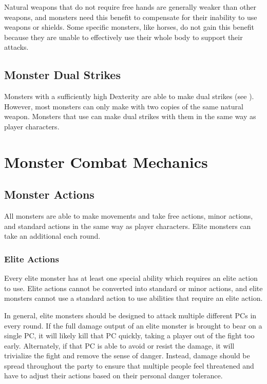         Natural weapons that do not require free hands are generally weaker than other weapons, and monsters need this benefit to compensate for their inability to use weapons or shields.
        Some specific monsters, like horses, do not gain this benefit because they are unable to effectively use their whole body to support their attacks.

    \subsection{Monster Dual Strikes}\label{Monster Dual Strikes}
        Monsters with a sufficiently high Dexterity are able to make dual strikes (see ).
        However, most monsters can only make  with two copies of the same  natural weapon.
        Monsters that use  can make dual strikes with them in the same way as player characters.

\section{Monster Combat Mechanics}

    \subsection{Monster Actions}\label{Monster Actions}
        All monsters are able to make movements and take free actions, minor actions, and standard actions in the same way as player characters.
        Elite monsters can take an additional  each round.

        \subsubsection{Elite Actions}\label{Elite Actions}
            Every elite monster has at least one special ability which requires an elite action to use.
            Elite actions cannot be converted into standard or minor actions, and elite monsters cannot use a standard action to use abilities that require an elite action.

            In general, elite monsters should be designed to attack multiple different PCs in every round.
            If the full damage output of an elite monster is brought to bear on a single PC, it will likely kill that PC quickly, taking a player out of the fight too early.
            Alternately, if that PC is able to avoid or resist the damage, it will trivialize the fight and remove the sense of danger.
            Instead, damage should be spread throughout the party to ensure that multiple people feel threatened and have to adjust their actions based on their personal danger tolerance.

